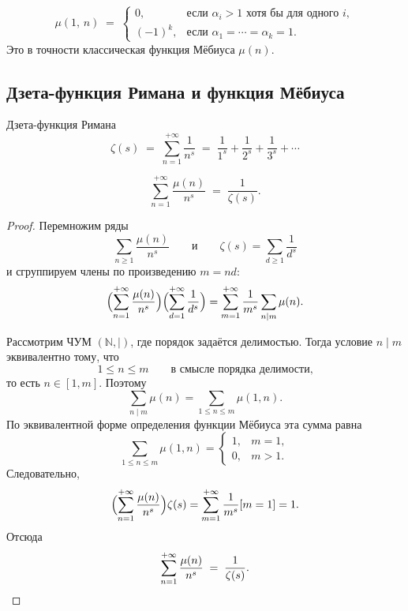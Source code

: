 \begin{Corollary}{}{}
	\[
	\mu(1,\, n) \;=\;
	\begin{cases}
		0,        & \text{если } \alpha_i > 1 \text{ хотя бы для одного } i,\\
		(-1)^{k}, & \text{если } \alpha_1 = \cdots = \alpha_k = 1.
	\end{cases}
	\]
	Это в точности классическая функция Мёбиуса $\mu(n)$.
\end{Corollary}

\subsection{Дзета-функция Римана и функция Мёбиуса}

\begin{Definition}{Дзета-функция Римана}{}
	\[
	\zeta(s) \;=\; \sum_{n=1}^{+\infty} \frac{1}{n^s}
	\;=\; \frac{1}{1^s} + \frac{1}{2^s} + \frac{1}{3^s} + \cdots
	\]
\end{Definition}

\begin{Theorem}{}{}
	\[
	\sum_{n=1}^{+\infty} \frac{\mu(n)}{n^s} \;=\; \frac{1}{\zeta(s)}.
	\]
\end{Theorem}

\begin{proof}
	Перемножим ряды
	\[
	\sum_{n \geq 1}\frac{\mu(n)}{n^s}
	\qquad \text{и} \qquad
	\zeta(s)=\sum_{d \geq 1}\frac{1}{d^s}
	\]
	и сгруппируем члены по произведению $m=nd$:
	\[
	\Bigl(\sum_{n=1}^{+\infty} \frac{\mu(n)}{n^s}\Bigr)
	\Bigl(\sum_{d=1}^{+\infty} \frac{1}{d^s}\Bigr)
	=
	\sum_{m=1}^{+\infty}\frac{1}{m^s}\sum_{n\mid m}\mu(n).
	\]
	
	Рассмотрим ЧУМ $(\mathbb{N},\mid)$, где порядок задаётся делимостью.
	Тогда условие $n\mid m$ эквивалентно тому, что
	\[
	1 \leq n \leq m
	\qquad \text{в смысле порядка делимости,}
	\]
	то есть $n \in [1,m]$. Поэтому
	\[
	\sum_{n\mid m}\mu(n)=\sum_{1\le n\le m}\mu(1,n).
	\]
	По эквивалентной форме определения функции Мёбиуса эта сумма равна
	\[
	\sum_{1\le n\le m}\mu(1,n)=
	\begin{cases}
		1, & m=1,\\
		0, & m>1.
	\end{cases}
	\]
	Следовательно,
	\[
	\Bigl(\sum_{n=1}^{+\infty} \frac{\mu(n)}{n^s}\Bigr)
	\zeta(s)
	=
	\sum_{m=1}^{+\infty}\frac{1}{m^s}[m=1]
	=1.
	\]
	Отсюда
	\[
	\sum_{n=1}^{+\infty} \frac{\mu(n)}{n^s}
	\;=\;
	\frac{1}{\zeta(s)}.\qedhere
	\]
\end{proof}

